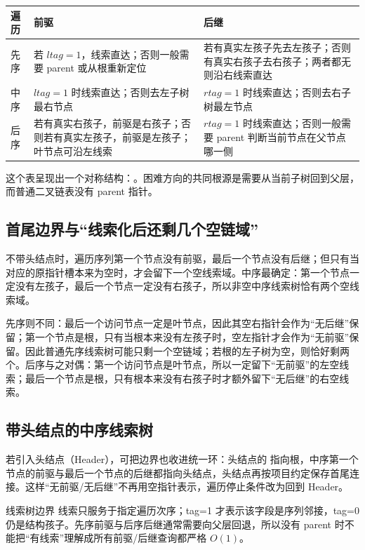 \documentclass[UTF8,fontset=none,11pt,a4paper]{ctexart}
\begin{document}
\begin{center}\small
\begin{tabularx}{\linewidth}{L{1.5cm}YY}
\toprule
遍历 & 前驱 & 后继\\\midrule
先序 & 若 $ltag=1$，线索直达；否则一般需要 parent 或从根重新定位 & 若有真实左孩子先去左孩子；否则有真实右孩子去右孩子；两者都无则沿右线索直达 \\
中序 & $ltag=1$ 时线索直达；否则去左子树最右节点 & $rtag=1$ 时线索直达；否则去右子树最左节点 \\
后序 & 若有真实右孩子，前驱是右孩子；否则若有真实左孩子，前驱是左孩子；叶节点可沿左线索 & $rtag=1$ 时线索直达；否则一般需要 parent 判断当前节点在父节点哪一侧 \\
\bottomrule
\end{tabularx}
\end{center}

这个表呈现出一个对称结构：。困难方向的共同根源是需要从当前子树回到父层，而普通二叉链表没有 parent 指针。

\subsection{首尾边界与“线索化后还剩几个空链域”}
不带头结点时，遍历序列第一个节点没有前驱，最后一个节点没有后继；但只有当对应的原指针槽本来为空时，才会留下一个空线索域。中序最确定：第一个节点一定没有左孩子，最后一个节点一定没有右孩子，所以非空中序线索树恰有两个空线索域。

先序则不同：最后一个访问节点一定是叶节点，因此其空右指针会作为“无后继”保留；第一个节点是根，只有当根本来没有左孩子时，空左指针才会作为“无前驱”保留。因此普通先序线索树可能只剩一个空链域；若根的左子树为空，则恰好剩两个。后序与之对偶：第一个访问节点是叶节点，所以一定留下“无前驱”的左空线索；最后一个节点是根，只有根本来没有右孩子时才额外留下“无后继”的右空线索。

\subsection{带头结点的中序线索树}
若引入头结点（Header），可把边界也收进统一环：头结点的  指向根，中序第一个节点的前驱与最后一个节点的后继都指向头结点，头结点再按项目约定保存首尾连接。这样“无前驱/无后继”不再用空指针表示，遍历停止条件改为回到 Header。

\begin{warnbox}{线索树边界}
线索只服务于指定遍历次序；tag=1 才表示该字段是序列邻接，tag=0 仍是结构孩子。先序前驱与后序后继通常需要向父层回退，所以没有 parent 时不能把“有线索”理解成所有前驱/后继查询都严格 $O(1)$。
\end{warnbox}
\end{document}
